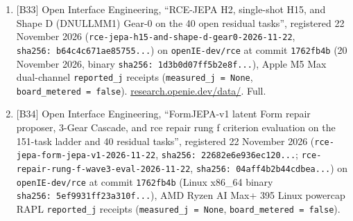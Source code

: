 \documentclass[10pt,letterpaper]{article}
\begin{document}
\begin{enumerate}
  {[}B32{]} Open Interface Engineering, ``Exact-proposer ladder with
  renames: registered run'', openIE-dev/openie-research-experiments,
  \texttt{rce/\allowbreak{}bench/\allowbreak{}ladder/\allowbreak{}rung-\allowbreak{}e/\allowbreak{}}: registration committed before the
  run at \texttt{be5f370d}, results at \texttt{3a5227c2}, merged at
  \texttt{f76ba9d8} (pull request \#23); ladder openIE-dev/rce
  \texttt{8a5d90ea}.
  \href{https://github.com/openIE-dev/openie-research-experiments/tree/f76ba9d8d02d57b773afbf105333417d55f72e2c/rce/bench/ladder/rung-e}{GitHub}.
  Full.
\item
  {[}B33{]} Open Interface Engineering, ``RCE-JEPA H2, single-shot H15,
  and Shape D (DNULLMM1) Gear-0 on the 40 open residual tasks'',
  registered 22 November 2026
  (\texttt{rce-\allowbreak{}jepa-\allowbreak{}h15-\allowbreak{}and-\allowbreak{}shape-\allowbreak{}d-\allowbreak{}gear0-\allowbreak{}2026-\allowbreak{}11-\allowbreak{}22},
  \texttt{sha256:\ b64c4c67\allowbreak{}1ae85755.\allowbreak{}.\allowbreak{}.\allowbreak{}}) on \texttt{openIE-\allowbreak{}dev/\allowbreak{}rce} at
  commit \texttt{1762fb4b} (20 November 2026, binary
  \texttt{sha256:\ 1d3b0d07\allowbreak{}ff5b2e8f.\allowbreak{}.\allowbreak{}.\allowbreak{}}), Apple M5 Max dual-channel
  \texttt{reported\_\allowbreak{}j} receipts (\texttt{measured\_\allowbreak{}j\ =\ None},
  \texttt{board\_\allowbreak{}metered\ =\ false}).
  \href{https://research.openie.dev/data/\#rce-jepa}{research.openie.dev/data/}.
  Full.
\item
  {[}B34{]} Open Interface Engineering, ``FormJEPA-v1 latent Form repair
  proposer, 3-Gear Cascade, and rce repair rung f criterion evaluation
  on the 151-task ladder and 40 residual tasks'', registered 22 November
  2026 (\texttt{rce-\allowbreak{}jepa-\allowbreak{}form-\allowbreak{}jepa-\allowbreak{}v1-\allowbreak{}2026-\allowbreak{}11-\allowbreak{}22},
  \texttt{sha256:\ 22682e6e\allowbreak{}936ec120.\allowbreak{}.\allowbreak{}.\allowbreak{}};
  \texttt{rce-\allowbreak{}repair-\allowbreak{}rung-\allowbreak{}f-\allowbreak{}wave3-\allowbreak{}eval-\allowbreak{}2026-\allowbreak{}11-\allowbreak{}22},
  \texttt{sha256:\ 04aff4b2\allowbreak{}b44cdbea.\allowbreak{}.\allowbreak{}.\allowbreak{}}) on \texttt{openIE-\allowbreak{}dev/\allowbreak{}rce} at
  commit \texttt{1762fb4b} (Linux x86\_64 binary
  \texttt{sha256:\ 5ef9931f\allowbreak{}f23a310f.\allowbreak{}.\allowbreak{}.\allowbreak{}}), AMD Ryzen AI Max+ 395 Linux
  powercap RAPL \texttt{reported\_\allowbreak{}j} receipts
  (\texttt{measured\_\allowbreak{}j\ =\ None}, \texttt{board\_\allowbreak{}metered\ =\ false}).

\end{enumerate}
\end{document}
